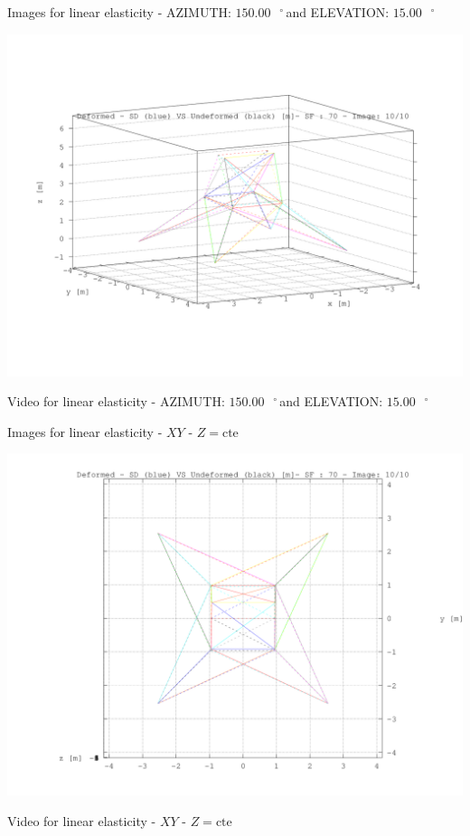 \documentclass[a4paper,11pt]{article}
\newcommand{\grad}{\hspace{-2.5mm}$\,\phantom{a}^{\circ}\,$}
\begin{document}
\newpage       

\newpage       
\begin{center}       
Images for linear elasticity - AZIMUTH: $150.00$\grad and ELEVATION: $ 15.00$\grad

\includegraphics[width=.80\textwidth]{../torre_deformed_10.png}      

Video for linear elasticity - AZIMUTH: $150.00$\grad and ELEVATION: $ 15.00$\grad


\end{center}       
\newpage       
\begin{center}       
Images for linear elasticity -  $XY$ - $Z=\text{cte}$ 

\includegraphics[width=.80\textwidth]{../../XY_XZ_YZ/XY/deformed/torre_deformed_XY_10.png}      


Video for linear elasticity -  $XY$ - $Z=\text{cte}$ 


\end{center}       
\end{document}
